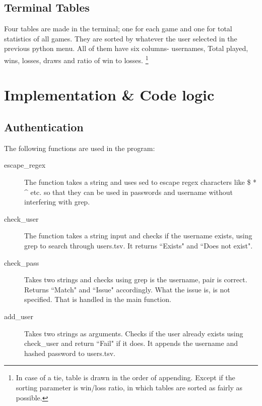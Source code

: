\documentclass[12pt]{article}
\begin{document}
\subsection{Terminal Tables}

Four tables are made in the terminal; one for each game and one for total statistics of all games. They are sorted by whatever the user selected in the previous python menu. All of them have six columns- usernames, Total played, wins, losses, draws and ratio of win to losses. \footnote{In case of a tie, table is drawn in the order of appending. Except if the sorting parameter is win/loss ratio, in which tables are sorted as fairly as possible.}

\section{Implementation \& Code logic}

\subsection {Authentication}

The following functions are used in the program: 
\begin{description}
    \item[escape\_regex] The function takes a string and uses sed to escape regex characters like \$ * \^{} etc. so that they can be used in passwords and username without interfering with grep.
    \item[check\_user] The function takes a string input and checks if the username exists, using grep to search through users.tsv. It returns ``Exists" and ``Does not exist".
    \item[check\_pass] Takes two strings and checks using grep is the username,  pair is correct. Returns ``Match" and ``Issue" accordingly. What the issue is, is not specified. That is handled in the main function.
    \item[add\_user] Takes two strings as arguments. Checks if the user already exists using check\_user and return ``Fail" if it does. It appends the username and hashed password to users.tsv.
\end{description}
\end{document}

